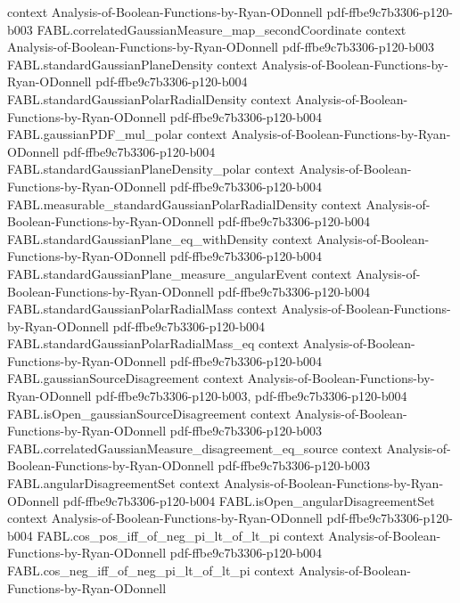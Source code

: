 \begin{theorem}
  {context}
  {Analysis-of-Boolean-Functions-by-Ryan-ODonnell}
  {pdf-ffbe9c7b3306-p120-b003}
\proofstep
  {FABL.correlatedGaussianMeasure_map_secondCoordinate}
  {context}
  {Analysis-of-Boolean-Functions-by-Ryan-ODonnell}
  {pdf-ffbe9c7b3306-p120-b003}
\proofstep
  {FABL.standardGaussianPlaneDensity}
  {context}
  {Analysis-of-Boolean-Functions-by-Ryan-ODonnell}
  {pdf-ffbe9c7b3306-p120-b004}
\proofstep
  {FABL.standardGaussianPolarRadialDensity}
  {context}
  {Analysis-of-Boolean-Functions-by-Ryan-ODonnell}
  {pdf-ffbe9c7b3306-p120-b004}
\proofstep
  {FABL.gaussianPDF_mul_polar}
  {context}
  {Analysis-of-Boolean-Functions-by-Ryan-ODonnell}
  {pdf-ffbe9c7b3306-p120-b004}
\proofstep
  {FABL.standardGaussianPlaneDensity_polar}
  {context}
  {Analysis-of-Boolean-Functions-by-Ryan-ODonnell}
  {pdf-ffbe9c7b3306-p120-b004}
\proofstep
  {FABL.measurable_standardGaussianPolarRadialDensity}
  {context}
  {Analysis-of-Boolean-Functions-by-Ryan-ODonnell}
  {pdf-ffbe9c7b3306-p120-b004}
\proofstep
  {FABL.standardGaussianPlane_eq_withDensity}
  {context}
  {Analysis-of-Boolean-Functions-by-Ryan-ODonnell}
  {pdf-ffbe9c7b3306-p120-b004}
\proofstep
  {FABL.standardGaussianPlane_measure_angularEvent}
  {context}
  {Analysis-of-Boolean-Functions-by-Ryan-ODonnell}
  {pdf-ffbe9c7b3306-p120-b004}
\proofstep
  {FABL.standardGaussianPolarRadialMass}
  {context}
  {Analysis-of-Boolean-Functions-by-Ryan-ODonnell}
  {pdf-ffbe9c7b3306-p120-b004}
\proofstep
  {FABL.standardGaussianPolarRadialMass_eq}
  {context}
  {Analysis-of-Boolean-Functions-by-Ryan-ODonnell}
  {pdf-ffbe9c7b3306-p120-b004}
\proofstep
  {FABL.gaussianSourceDisagreement}
  {context}
  {Analysis-of-Boolean-Functions-by-Ryan-ODonnell}
  {pdf-ffbe9c7b3306-p120-b003,
    pdf-ffbe9c7b3306-p120-b004}
\proofstep
  {FABL.isOpen_gaussianSourceDisagreement}
  {context}
  {Analysis-of-Boolean-Functions-by-Ryan-ODonnell}
  {pdf-ffbe9c7b3306-p120-b003}
\proofstep
  {FABL.correlatedGaussianMeasure_disagreement_eq_source}
  {context}
  {Analysis-of-Boolean-Functions-by-Ryan-ODonnell}
  {pdf-ffbe9c7b3306-p120-b003}
\proofstep
  {FABL.angularDisagreementSet}
  {context}
  {Analysis-of-Boolean-Functions-by-Ryan-ODonnell}
  {pdf-ffbe9c7b3306-p120-b004}
\proofstep
  {FABL.isOpen_angularDisagreementSet}
  {context}
  {Analysis-of-Boolean-Functions-by-Ryan-ODonnell}
  {pdf-ffbe9c7b3306-p120-b004}
\proofstep
  {FABL.cos_pos_iff_of_neg_pi_lt_of_lt_pi}
  {context}
  {Analysis-of-Boolean-Functions-by-Ryan-ODonnell}
  {pdf-ffbe9c7b3306-p120-b004}
\proofstep
  {FABL.cos_neg_iff_of_neg_pi_lt_of_lt_pi}
  {context}
  {Analysis-of-Boolean-Functions-by-Ryan-ODonnell}

\end{theorem}
